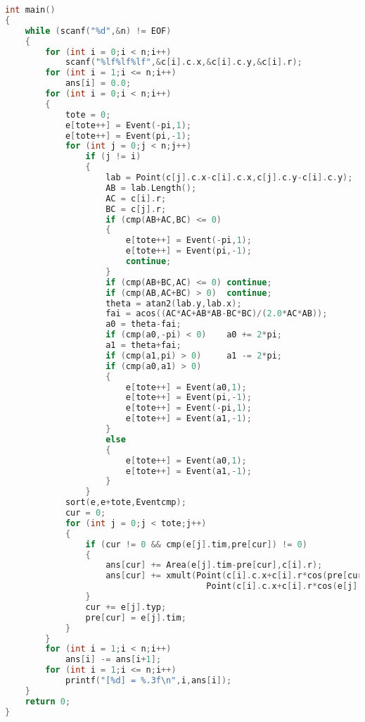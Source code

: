\begin{lstlisting}[language=c++]
int main()
{
    while (scanf("%d",&n) != EOF)
    {
        for (int i = 0;i < n;i++)
            scanf("%lf%lf%lf",&c[i].c.x,&c[i].c.y,&c[i].r);
        for (int i = 1;i <= n;i++)
            ans[i] = 0.0;
        for (int i = 0;i < n;i++)
        {
            tote = 0;
            e[tote++] = Event(-pi,1);
            e[tote++] = Event(pi,-1);
            for (int j = 0;j < n;j++)
                if (j != i)
                {
                    lab = Point(c[j].c.x-c[i].c.x,c[j].c.y-c[i].c.y);
                    AB = lab.Length();
                    AC = c[i].r;
                    BC = c[j].r;
                    if (cmp(AB+AC,BC) <= 0)
                    {
                        e[tote++] = Event(-pi,1);
                        e[tote++] = Event(pi,-1);
                        continue;
                    }
                    if (cmp(AB+BC,AC) <= 0) continue;
                    if (cmp(AB,AC+BC) > 0)  continue;
                    theta = atan2(lab.y,lab.x);
                    fai = acos((AC*AC+AB*AB-BC*BC)/(2.0*AC*AB));
                    a0 = theta-fai;
                    if (cmp(a0,-pi) < 0)    a0 += 2*pi;
                    a1 = theta+fai;
                    if (cmp(a1,pi) > 0)     a1 -= 2*pi;
                    if (cmp(a0,a1) > 0)
                    {
                        e[tote++] = Event(a0,1);
                        e[tote++] = Event(pi,-1);
                        e[tote++] = Event(-pi,1);
                        e[tote++] = Event(a1,-1);
                    }
                    else
                    {
                        e[tote++] = Event(a0,1);
                        e[tote++] = Event(a1,-1);
                    }
                }
            sort(e,e+tote,Eventcmp);
            cur = 0;
            for (int j = 0;j < tote;j++)
            {
                if (cur != 0 && cmp(e[j].tim,pre[cur]) != 0)
                {
                    ans[cur] += Area(e[j].tim-pre[cur],c[i].r);
                    ans[cur] += xmult(Point(c[i].c.x+c[i].r*cos(pre[cur]),c[i].c.y+c[i].r*sin(pre[cur])),
                                        Point(c[i].c.x+c[i].r*cos(e[j].tim),c[i].c.y+c[i].r*sin(e[j].tim)))/2.0;
                }
                cur += e[j].typ;
                pre[cur] = e[j].tim;
            }
        }
        for (int i = 1;i < n;i++)
            ans[i] -= ans[i+1];
        for (int i = 1;i <= n;i++)
            printf("[%d] = %.3f\n",i,ans[i]);
    }
    return 0;
}
	\end{lstlisting}